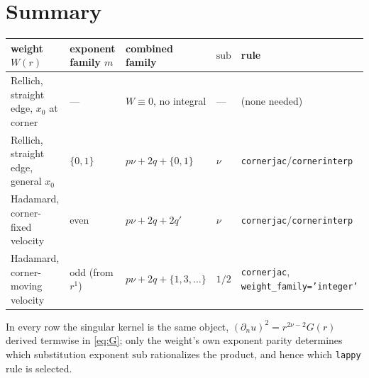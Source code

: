 \documentclass[11pt]{article}
\theoremstyle{remark}
\newcommand{\code}[1]{\texttt{#1}}
\begin{document}
\section{Summary}\label{sec:summary}

\begin{center}\small
\begin{tabular}{@{}lllll@{}}
\toprule
weight $W(r)$ & exponent family $m$ & combined family & $\mathrm{sub}$ & rule\\
\midrule
Rellich, straight edge, $x_0$ at corner & --- & $W\equiv0$, no integral & --- & (none needed)\\
Rellich, straight edge, general $x_0$ & $\{0,1\}$ & $p\nu+2q+\{0,1\}$ & $\nu$ & \code{cornerjac}/\code{cornerinterp}\\
Hadamard, corner-fixed velocity & even & $p\nu+2q+2q'$ & $\nu$ & \code{cornerjac}/\code{cornerinterp}\\
Hadamard, corner-moving velocity & odd (from $r^1$) & $p\nu+2q+\{1,3,\dots\}$ & $1/2$ & \code{cornerjac}, \code{weight\_family='integer'}\\
\bottomrule
\end{tabular}
\end{center}

\noindent
In every row the singular kernel is the same object, $(\partial_n u)^2 = r^{2\nu-2}G(r)$ derived
termwise in \eqref{eq:G}; only the weight's own exponent parity determines which substitution
exponent $\mathrm{sub}$ rationalizes the product, and hence which \code{lappy} rule is selected.
\end{document}
